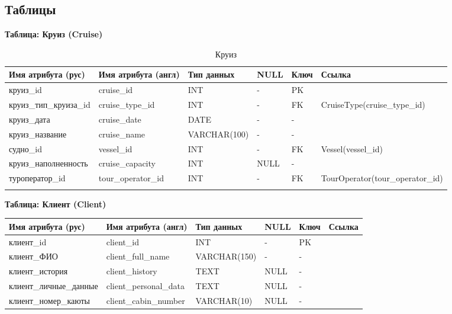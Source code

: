\documentclass[11pt,a4paper,final]{article}
\begin{document}
\newpage
\begin{landscape}
    \ClearShipoutPicture %
    \thispagestyle{empty}
\subsection{Таблицы}

\centering

\textbf{Таблица: Круиз (Cruise)}

\begin{longtable}{|p{4cm}|p{3cm}|p{2.6cm}|p{1cm}|p{1cm}|p{5.5cm}|}
\hline
Имя атрибута (рус) & Имя атрибута (англ) & Тип данных & NULL & Ключ & Ссылка \\ \hline
\endhead

круиз\_id & cruise\_id & INT & - & PK & \\ \hline
круиз\_тип\_круиза\_id & cruise\_type\_id & INT & - & FK & CruiseType(cruise\_type\_id) \\ \hline
круиз\_дата & cruise\_date & DATE & - & - & \\ \hline
круиз\_название & cruise\_name & VARCHAR(100) & - & - & \\ \hline
судно\_id & vessel\_id & INT & - & FK & Vessel(vessel\_id) \\ \hline
круиз\_наполненность & cruise\_capacity & INT & NULL & - & \\ \hline
туроператор\_id & tour\_operator\_id & INT & - & FK & TourOperator(tour\_operator\_id) \\ \hline

\caption{Круиз}
\end{longtable}

\textbf{Таблица: Клиент (Client)}

\begin{longtable}{|p{4.3cm}|p{4cm}|p{2.6cm}|p{1cm}|p{1cm}|p{2cm}|}
\hline
Имя атрибута (рус) & Имя атрибута (англ) & Тип данных & NULL & Ключ & Ссылка \\ \hline
\endhead

клиент\_id & client\_id & INT & - & PK & \\ \hline
клиент\_ФИО & client\_full\_name & VARCHAR(150) & - & - & \\ \hline
клиент\_история & client\_history & TEXT & NULL & - & \\ \hline
клиент\_личные\_данные & client\_personal\_data & TEXT & NULL & - & \\ \hline
клиент\_номер\_каюты & client\_cabin\_number & VARCHAR(10) & NULL & - & \\ \hline


\end{longtable}
\end{landscape}
\end{document}
